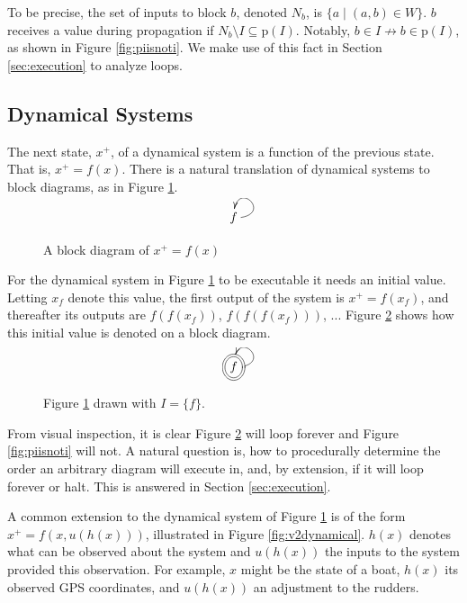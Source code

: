 \documentclass[twocolumn]{article}
\newcommand*{\Inputs}[1]{N_{#1}}
\begin{document}
To be precise, the set of inputs to block $b$, denoted $\Inputs{b}$, is $\{a \mid (a, b)\in W\}$. $b$ receives a value during propagation if $\Inputs{b}\setminus I\subseteq \text{p}(I)$. Notably, $b\in I\not\rightarrow b\in \text{p}(I)$, as shown in Figure \ref{fig:piisnoti}. We make use of this fact in Section \ref{sec:execution} to analyze loops.

\subsection{Dynamical Systems}\label{sec:dynamical}

The next state, $x^+$, of a dynamical system is a function of the previous state. That is, $x^+=f(x)$. There is a natural translation of dynamical systems to block diagrams, as in Figure \ref{fig:simpledynamical}.

\begin{figure}[h]
\[
    \xymatrix {
        f \ar@(r, u)[]
    }
\]
    \caption{A block diagram of $x^+=f(x)$}
    \label{fig:simpledynamical}
\end{figure}

For the dynamical system in Figure \ref{fig:simpledynamical} to be executable it needs an initial value. Letting $x_f$ denote this value, the first output of the system is $x^+=f(x_f)$, and thereafter its outputs are $f(f(x_f))$, $f(f(f(x_f)))$, ... Figure \ref{fig:simpleinitialization} shows how this initial value is denoted on a block diagram.

\begin{figure}[h]
\[
    \xymatrix {
        *++[o][F=]{f} \ar@(r, u)[]
    }
\]
    \caption{Figure \ref{fig:simpledynamical} drawn with $I=\{f\}$.}
    \label{fig:simpleinitialization}
\end{figure}

From visual inspection, it is clear Figure \ref{fig:simpleinitialization} will loop forever and Figure \ref{fig:piisnoti} will not. A natural question is, how to procedurally determine the order an arbitrary diagram will execute in, and, by extension, if it will loop forever or halt. This is answered in Section \ref{sec:execution}.

A common extension to the dynamical system of Figure \ref{fig:simpledynamical} is of the form $x^+=f(x,u(h(x)))$, illustrated in Figure \ref{fig:v2dynamical}. $h(x)$ denotes what can be observed about the system and $u(h(x))$ the inputs to the system provided this observation. For example, $x$ might be the state of a boat, $h(x)$ its observed GPS coordinates, and $u(h(x))$ an adjustment to the rudders.
\end{document}
